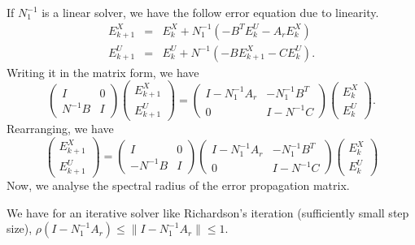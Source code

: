 \begin{itemize}
If $N_1^{-1}$ is a linear solver, we have the follow error equation due to linearity. 
\begin{eqnarray}
 E^X_{k+1} & = & E^X_{k} + N_1^{-1} (-B^T E^U_k - A_r E^X_k) \\
 E_{k+1}^U &=& E_{k}^U + N^{-1} (- B E^X_{k+1} - C E^U_k).
\end{eqnarray}
Writing it in the matrix form, we have 
\begin{equation}
    \begin{pmatrix}
     I & 0\\
     N^{-1} B & I
    \end{pmatrix} 
    \begin{pmatrix}
    E^X_{k+1} \\
    E^U_{k+1}
    \end{pmatrix} 
  = \begin{pmatrix}
    I - N_1^{-1} A_r & - N_1^{-1} B^T \\
    0 & I - N^{-1} C
    \end{pmatrix}
    \begin{pmatrix}
    E^X_{k} \\
    E^U_{k}
    \end{pmatrix}  . 
\end{equation}
Rearranging, we have 
\begin{equation}\begin{pmatrix}
    E^X_{k+1} \\
    E^U_{k+1}
    \end{pmatrix} = 
        \begin{pmatrix}
     I & 0\\
     - N^{-1} B & I
    \end{pmatrix} 
    \begin{pmatrix}
    I - N_1^{-1} A_r & - N_1^{-1} B^T \\
    0 & I - N^{-1} C
    \end{pmatrix}
    \begin{pmatrix}
    E^X_{k} \\
    E^U_{k}
    \end{pmatrix}  
\end{equation}
Now, we analyse the spectral radius of the error propagation matrix. 

We have for an iterative solver like Richardson's iteration (sufficiently small step size), 
$\rho(I - N_1^{-1} A_r) \leq \| I -N_1^{-1} A_r \| \leq 1 $. 


\end{itemize}
